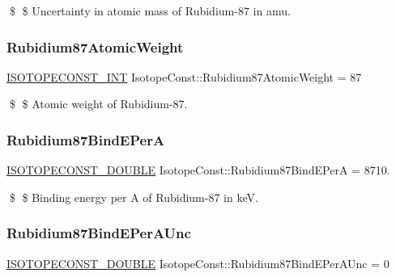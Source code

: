 \$ \$ Uncertainty in atomic mass of Rubidium-\/87 in amu. \mbox{\label{group___isotope_const-_rubidium-_rb87_gaeffad89c5687c7ef17625446d999f0f9}} 
\subsubsection{\texorpdfstring{Rubidium87\+Atomic\+Weight}{Rubidium87AtomicWeight}}
{\footnotesize\ttfamily \mbox{\hyperlink{group___isotope_const-_macros_ga5f18360b3e99483a35c32d789e62621c}{I\+S\+O\+T\+O\+P\+E\+C\+O\+N\+S\+T\+\_\+\+I\+NT}} Isotope\+Const\+::\+Rubidium87\+Atomic\+Weight = 87}

\$ \$ Atomic weight of Rubidium-\/87. \mbox{\label{group___isotope_const-_rubidium-_rb87_ga55140142acaf9a489813517ae03ddddd}} 
\subsubsection{\texorpdfstring{Rubidium87\+Bind\+E\+PerA}{Rubidium87BindEPerA}}
{\footnotesize\ttfamily \mbox{\hyperlink{group___isotope_const-_macros_ga8f45a7272ce02c0b4c65c44636ed719a}{I\+S\+O\+T\+O\+P\+E\+C\+O\+N\+S\+T\+\_\+\+D\+O\+U\+B\+LE}} Isotope\+Const\+::\+Rubidium87\+Bind\+E\+PerA = 8710.}

\$ \$ Binding energy per A of Rubidium-\/87 in keV. \mbox{\label{group___isotope_const-_rubidium-_rb87_gaa17aaa4614a653e4f206dda9ca3188ff}} 
\subsubsection{\texorpdfstring{Rubidium87\+Bind\+E\+Per\+A\+Unc}{Rubidium87BindEPerAUnc}}
{\footnotesize\ttfamily \mbox{\hyperlink{group___isotope_const-_macros_ga8f45a7272ce02c0b4c65c44636ed719a}{I\+S\+O\+T\+O\+P\+E\+C\+O\+N\+S\+T\+\_\+\+D\+O\+U\+B\+LE}} Isotope\+Const\+::\+Rubidium87\+Bind\+E\+Per\+A\+Unc = 0}

